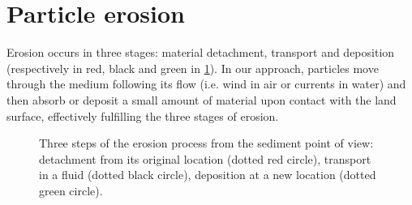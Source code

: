 






\section{Particle erosion}
\label{sec:erosion-method}
Erosion occurs in three stages: material detachment, transport and deposition (respectively in red, black and green in \cref{fig:erosion-ablation_erosion}). In our approach, particles move through the medium following its flow (i.e. wind in air or currents in water) and then absorb or deposit a small amount of material upon contact with the land surface, effectively fulfilling the three stages of erosion.
\begin{figure}
\centering
{}
\caption{Three steps of the erosion process from the sediment point of view: detachment from its original location (dotted red circle), transport in a fluid (dotted black circle), deposition at a new location (dotted green circle).}
\label{fig:erosion-ablation_erosion}

\end{figure}
